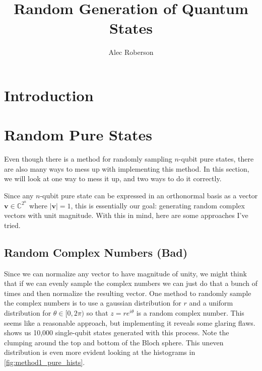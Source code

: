 \documentclass{paper}[11pt]
\title{Random Generation of Quantum States}
\author{Alec Roberson}
\newcommand{\bv}[1]{\textbf{#1}}
\begin{document}
	\maketitle
	
	\section{Introduction}
	
	

	\section{Random Pure States}
	
	Even though there is a method for randomly sampling $n$-qubit pure states, there are also many ways to mess up with implementing this method. In this section, we will look at one way to mess it up, and two ways to do it correctly.
	
	Since any $n$-qubit pure state can be expressed in an orthonormal basis as a vector $\bv{v}\in\mathbb{C}^{2^n}$ where $|\bv{v}|=1$, this is essentially our goal: generating random complex vectors with unit magnitude. With this in mind, here are some approaches I've tried.
	
	\subsection{Random Complex Numbers (Bad)}
	Since we can normalize any vector to have magnitude of unity, we might think that if we can evenly sample the complex numbers we can just do that a bunch of times and then normalize the resulting vector. One method to randomly sample the complex numbers is to use a gaussian distribution for $r$ and a uniform distribution for $\theta\in[0,2\pi)$ so that $z=re^{i\theta}$ is a random complex number. This seems like a reasonable approach, but implementing it reveals some glaring flaws.  shows us 10,000 single-qubit states generated with this process. Note the clumping around the top and bottom of the Bloch sphere. This uneven distribution is even more evident looking at the histograms in \cref{fig:method1_pure_hists}.
	
\end{document}
